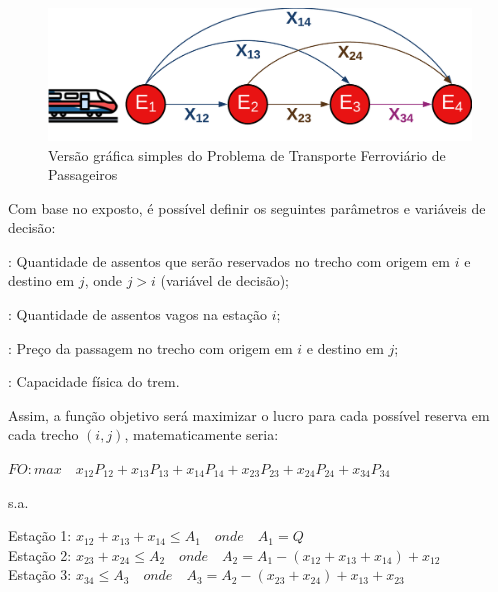 \begin{figure}[H]
	\begin{center}
		\includegraphics[scale=0.18]{img/repre_ini1.png}
		\caption{Versão gráfica simples do Problema de Transporte Ferroviário de Passageiros}
		\label{fig: fig1}
	\end{center}
\end{figure}
\vspace{-1cm}

Com base no exposto, é possível definir os seguintes parâmetros e variáveis de decisão:

\begin{description}[style=unboxed, leftmargin=2.5cm, labelindent=1.5cm]
	\setlength{\itemsep}{-2.2em} %
	\setlength{\parskip}{0em} %
	\item[$x_{ij}$]: Quantidade de assentos que serão reservados no trecho com origem em $i$ e destino em $j$, onde $j>i$ (variável de decisão); \\
	\item[$A_i$]: Quantidade de assentos vagos na estação $i$; \\
	\item[$P_{ij}$]: Preço da passagem no trecho com origem em $i$ e destino em $j$; \\
	\item[$Q$]: Capacidade física do trem.
\end{description}



Assim, a função objetivo será maximizar o lucro para cada possível reserva em cada trecho $(i,j)$, matematicamente seria:

$FO: max \quad x_{12}P_{12} + x_{13}P_{13} + x_{14}P_{14} + x_{23}P_{23} + x_{24}P_{24} + x_{34}P_{34}$

s.a.

Estação 1: $x_{12} + x_{13} + x_{14} \leq A_1 \quad onde \quad A_1 = Q $ \\
\indent Estação 2: $x_{23} + x_{24}  \leq  A_2 \quad onde \quad A_2 = A_1 - (x_{12} + x_{13} + x_{14}) + x_{12} $ \\
\indent Estação 3: $x_{34} \leq A_3 \quad onde \quad A_3 = A_2 - (x_{23} + x_{24}) + x_{13} + x_{23} $

